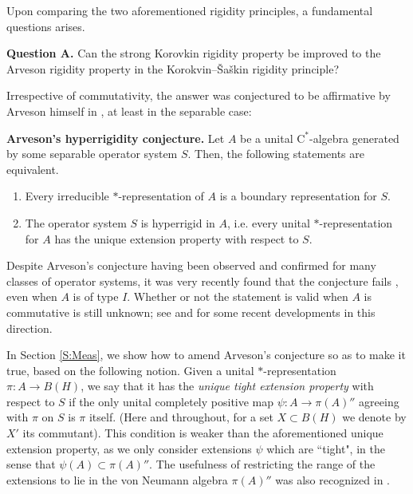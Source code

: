 \documentclass[10pt]{amsart}
\newcommand{\rC}{\mathrm{C}}
\theoremstyle{definition}
\begin{document}
\vspace{3mm}


Upon comparing the two aforementioned rigidity principles, a fundamental questions arises.

\vspace{3mm}

\noindent \textbf{Question A.} 
Can the strong Korovkin rigidity property be improved to the Arveson rigidity property in the Korokvin--\v{S}a\v{s}kin rigidity principle?

\vspace{3mm}

 Irrespective of commutativity, the answer was conjectured to be affirmative by Arveson himself in \cite{arveson2011noncommutative}, at least in the separable case:

\vspace{3mm}

\noindent \textbf{Arveson's hyperrigidity conjecture. }
Let $A$ be a unital  $\rC^*$-algebra generated by some separable operator system $S$. Then, the following statements are equivalent.
\begin{enumerate}[\rm (i)]
\item Every irreducible $*$-representation of $A$ is a boundary representation for $S$.
\item The operator system $S$ is hyperrigid in $A$, i.e. every unital $*$-representation for $A$ has the unique extension property with respect to  $S$.
\end{enumerate}

\vspace{3mm}

Despite Arveson's conjecture having been observed and confirmed for many classes of operator systems, it was very recently found that the conjecture fails \cite{bilich2024arveson}, even when $A$ is of type $I$. Whether or not the statement is valid when $A$ is commutative is still unknown; see \cite{davidson2021choquet} and \cite{clouatre2023boundary} for some recent developments in this direction.

In Section \ref{S:Meas}, we show how to amend Arveson's conjecture so as to make it true, based on the following notion. Given a unital $*$-representation $\pi:A\to B(H)$, we say that it has the \emph{unique tight extension property}  with respect to $S$ if  the only unital completely positive map $\psi:A\to \pi(A)''$ agreeing with $\pi$ on $S$ is $\pi$ itself.  (Here and throughout, for a set $X\subset B(H)$ we denote by $X'$ its commutant). This condition is weaker than the aforementioned unique extension property, as we only consider extensions $\psi$ which are ``tight", in the sense that $\psi(A)\subset \pi(A)''$. The usefulness of restricting the range of the extensions to lie in the von Neumann algebra $\pi(A)''$ was also recognized  in \cite{kleski2014korovkin}.
\end{document}
